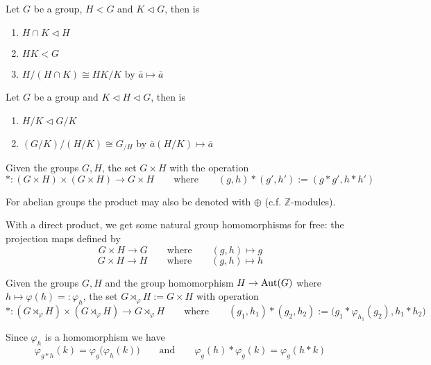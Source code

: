 \begin{proposition}
   Let \(G\) be a group, \(H < G\) and \(K \triangleleft G\), then is
   \begin{enumerate}[label=\roman*, align=Center]
      \item \(H \cap K \triangleleft H\)
      \item \(HK < G\)
      \item \(H/(H \cap K) \cong HK/K\) by \(\bar{a} \mapsto \bar{a}\)
   \end{enumerate}
\end{proposition}

\begin{proposition}
   Let \(G\) be a group and \(K \triangleleft H \triangleleft G\), then is
   \begin{enumerate}[label=\roman*, align=Center]
      \item \(H/K \triangleleft G/K\)
      \item \((G/K)/(H/K) \cong G_{/H}\) by \(\bar{a}(H/K) \mapsto \bar{a}\)
   \end{enumerate}
\end{proposition}

\begin{definition}
   Given the groups \(G, H\), the set \(G \times H\) with the operation
   \[\ast: (G \times H) \times (G \times H) \to G \times H \qquad\text{where}\qquad (g, h) \ast (g', h') := (g \ast g', h \ast h')\]
\end{definition}
\begin{remark}[Notation]
   For abelian groups the product may also be denoted with \(\oplus\) (c.f. \(\mathbb{Z}\)-modules).
\end{remark}
\begin{remark}
   With a direct product, we get some natural group homomorphisms for free: the projection maps defined by
   \[G \times H \to G \qquad \text{where}\qquad (g, h) \mapsto g\]
   \[G \times H \to H \qquad \text{where}\qquad (g, h) \mapsto h\]
\end{remark}

\begin{definition}
   Given the groups \(G, H\) and the group homomorphism \(H \to \operatorname{Aut}(G)\) where \(h \mapsto \varphi(h) =: \varphi_h\), the set \(G \rtimes_\varphi H := G \times H\) with operation
   \[\ast: (G \rtimes_\varphi H) \times (G \rtimes_\varphi H) \to G \rtimes_\varphi H \qquad\text{where}\qquad (g_1, h_1) \ast (g_2, h_2) := \big(g_1 \ast \varphi_{h_1}(g_2), h_1 \ast h_2\big)\]
\end{definition}
\begin{remark}
   Since \(\varphi_h\) is a homomorphism we have
   \[\varphi_{g \ast h}(k) = \varphi_g\big(\varphi_h(k)\big) \qquad\text{and}\qquad \varphi_g(h) \ast \varphi_g(k) = \varphi_g(h \ast k)\]
\end{remark}

